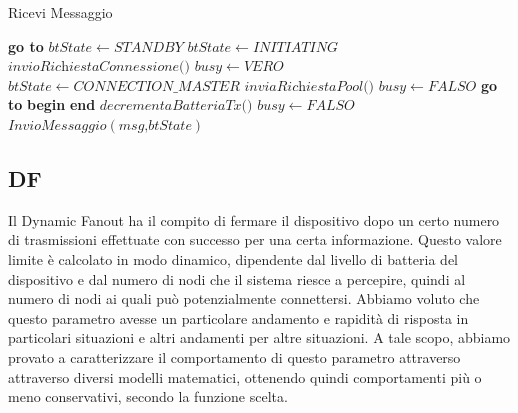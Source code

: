 \bigskip
\begin{algorithm}[t]
	\caption{Ricevi Messaggio}\label{alg:ricevi_msg}
	\begin{algorithmic}[1]
			\State \textbf{go to} 
		\EndIf
		\Label {}
		\State $\textit{btState} \gets STANDBY$
		\State $\textit{btState} \gets INITIATING$
		\Label {}
		\State $ \textit{invioRichiestaConnessione()}$
		\State $ \textit{busy} \gets VERO$
		\State $ \textit{btState} \gets CONNECTION\_MASTER $
		\State $ \textit{inviaRichiestaPool()}$
			\State $ \textit{busy} \gets FALSO$ 
			\State \textbf{go to} 
		\EndIf
		\State \textbf{begin}
			\State{}
		\State \textbf{end}
		\State $ \textit{decrementaBatteriaTx()} $
		\State $ \textit{busy} \gets FALSO$
		\State $ \textit{InvioMessaggio}\left(\textit{msg,btState}\right)  $
		\EndFunction
	\end{algorithmic}
\end{algorithm}
\bigskip

\subsection{\acf{DF}}
Il Dynamic Fanout ha il compito di fermare il dispositivo dopo un certo numero di trasmissioni effettuate con successo per una certa informazione. Questo valore limite è calcolato in modo dinamico, dipendente dal livello di batteria del dispositivo e dal numero di nodi che il sistema riesce a percepire, quindi al numero di nodi ai quali può potenzialmente connettersi. Abbiamo voluto che questo parametro avesse un particolare andamento e rapidità di risposta in particolari situazioni e altri andamenti per altre situazioni. A tale scopo, abbiamo provato a caratterizzare il comportamento di questo parametro attraverso attraverso diversi modelli matematici, ottenendo quindi comportamenti più o meno conservativi, secondo la funzione scelta.

